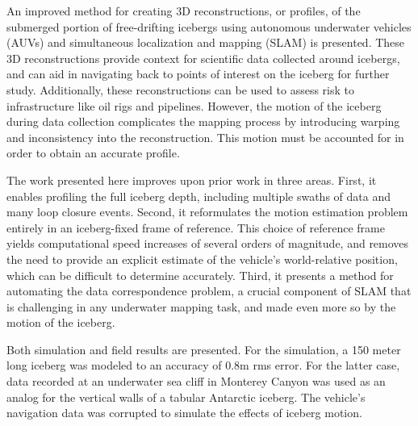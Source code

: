 
\noindent An improved method for creating 3D reconstructions, or profiles, of the submerged portion of free-drifting icebergs using autonomous underwater vehicles (AUVs) and simultaneous localization and mapping (SLAM) is presented. These 3D reconstructions  provide context for scientific data collected around icebergs, and can aid in navigating back to points of interest on the iceberg for further study. Additionally, these reconstructions can be used to assess risk to infrastructure like oil rigs and pipelines. However, the motion of the iceberg during data collection complicates the mapping process by introducing warping and inconsistency into the reconstruction. This motion must be accounted for in order to obtain an accurate profile. 

The work presented here improves upon prior work in three areas. First, it enables profiling the full iceberg depth, including multiple swaths of data and many loop closure events. Second, it reformulates the motion estimation problem entirely in an iceberg-fixed frame of reference. This choice of reference frame yields computational speed increases of several orders of magnitude, and removes the need to provide an explicit estimate of the vehicle's world-relative position, which can be difficult to determine accurately. Third, it presents a method for automating the data correspondence problem, a crucial component of SLAM that is challenging in any underwater mapping task, and made even more so by the motion of the iceberg.

Both simulation and field results are presented.  For the simulation, a 150 meter long iceberg was modeled to an accuracy of 0.8m rms error. For the latter case, data recorded at an underwater sea cliff in Monterey Canyon was used as an analog for the vertical walls of a tabular Antarctic iceberg. The vehicle's navigation data was corrupted to simulate the effects of iceberg motion.
